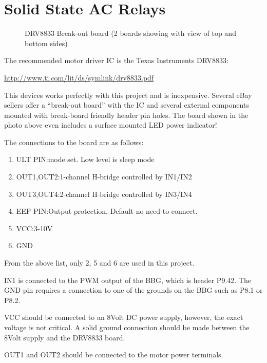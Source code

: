 %
%
%

\chapter{Solid State AC Relays}

\begin{figure}[h]
	\centering
	\centering\bfseries
	\caption{DRV8833 Break-out board (2 boards showing with view of top and bottom sides)}
\end{figure}


The recommended motor driver IC is the Texas Instruments DRV8833:

\url{http://www.ti.com/lit/ds/symlink/drv8833.pdf}

This devices works perfectly with this project and is inexpensive.
Several eBay sellers offer a ``break-out board'' with the IC and several external components mounted with break-board friendly header pin holes.  The board shown in the photo above even includes a surface mounted LED power indicator!

The connections to the board are as follows:

\begin{enumerate}
\item ULT PIN:mode set. Low level is sleep mode
\item OUT1,OUT2:1-channel H-bridge controlled by IN1/IN2
\item OUT3,OUT4:2-channel H-bridge controlled by IN3/IN4
\item EEP PIN:Output protection. Default no need to connect.
\item VCC:3-10V
\item GND
\end{enumerate}

From the above list, only 2, 5 and 6 are used in this project.

IN1 is connected to the PWM output of the BBG, which is header P9.42.
The GND pin requires a connection to one of the grounds on the BBG such as P8.1 or P8.2.

VCC should be connected to an 8Volt DC power supply, however, the exact voltage is not critical.  A solid ground connection should be made between the 8Volt supply and the DRV8833 board.

OUT1 and OUT2 should be connected to the motor power terminals.

